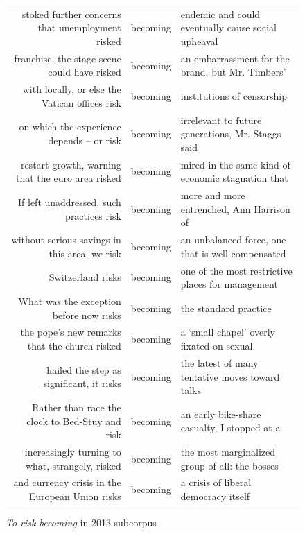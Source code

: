             \begin{figure}
            \footnotesize
            \begin{tabular}{rcl}
    stoked further concerns that unemployment risked &  becoming &  endemic and could eventually cause social upheaval  \\ 
     franchise, the stage scene could have risked &  becoming &  an embarrassment for the brand, but Mr. Timbers'   \\ 
   with locally, or else the Vatican offices risk &  becoming &  institutions of censorship   \\ 
           on which the experience depends -- or risk &  becoming &  irrelevant to future generations, Mr. Staggs said   \\ 
   restart growth, warning that the euro area risked &  becoming &  mired in the same kind of economic stagnation that   \\ 
            If left unaddressed, such practices risk &  becoming &  more and more entrenched, Ann Harrison of   \\ 
    without serious savings in this area, we risk &  becoming &  an unbalanced force, one that is well compensated   \\ 
                                    Switzerland risks &  becoming &  one of the most restrictive places for management   \\ 
              What was the exception before now risks &  becoming &  the standard practice   \\ 
       the pope's new remarks that the church risked &  becoming &  a `small chapel' overly fixated on sexual   \\ 
            hailed the step as significant, it risks &  becoming &  the latest of many tentative moves toward talks   \\ 
      Rather than race the clock to Bed-Stuy and risk &  becoming &  an early bike-share casualty, I stopped at a   \\ 
   increasingly turning to what, strangely, risked &  becoming &  the most marginalized group of all: the bosses   \\ 
    and currency crisis in the European Union risks &  becoming &  a crisis of liberal democracy itself \\ 
            \end{tabular}
            \caption{\emph{To risk becoming} in 2013 subcorpus}
            \end{figure}
			

